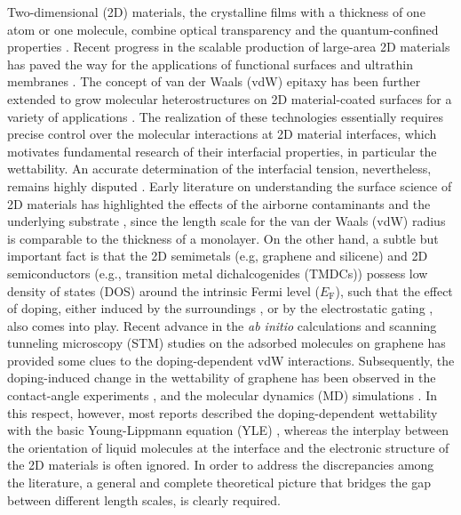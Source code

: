 \documentclass[journal=jacsat,manuscript=article,email=true,hyperref=true,keywords=true]{achemso}
\begin{document}
Two-dimensional (2D) materials, the crystalline films with a thickness
of one atom or one molecule, combine optical transparency and the
quantum-confined properties
\cite{Novoselov_2005,Mas_Ballest__2011,Novoselov_2016}.  Recent progress
in the scalable production of large-area 2D materials
\cite{Boott_2015,Li_2016} has paved the way for the applications of
functional surfaces and ultrathin membranes
\cite{Prasai_2012,Feng_2016,Rafiee_2010,Yin_2014,Surwade_2015,Hern_ndez_2013}.
The concept of van der Waals (vdW) epitaxy has been further extended
to grow molecular heterostructures on 2D material-coated surfaces for
a variety of applications
\cite{Shi_2012_epitaxy_graphene,Kim_2017_remote_epitaxy,Novoselov_2016}. The
realization of these technologies essentially requires precise control
over the molecular interactions at 2D material interfaces, which
motivates fundamental research of their interfacial properties, in
particular the wettability.  An accurate determination of the
interfacial tension, nevertheless, remains highly disputed
\cite{taherian2013what,Kozbial_2015,Parobek_2015,Govind_Rajan_2016}. Early
literature on understanding the surface science of 2D materials has
highlighted the effects of the airborne contaminants
\cite{li_effect_2013,Xu_2013_withwhat,kozbial_study_2014,Kozbial_2015,Chow_2015}
and the underlying substrate
\cite{raj_wettability_2013,rafiee_wetting_2012,shih_breakdown_2012,shih_wetting_2013},
since the length scale for the van der Waals (vdW) radius is
comparable to the thickness of a monolayer. On the other hand, a
subtle but important fact is that the 2D semimetals (e.g, graphene and
silicene) and 2D semiconductors (e.g., transition metal
dichalcogenides (TMDCs)) possess low density of states (DOS) around
the intrinsic Fermi level (\(E_{\mathrm{F}}\)), such that the effect of
doping, either induced by the surroundings
\cite{Chen_2013,Varchon_2007,Giovannetti_2008}, or by the electrostatic
gating \cite{Das_2008,Perera_2013}, also comes into play. Recent advance
in the \textit{ab initio} calculations and scanning tunneling
microscopy (STM) studies on the adsorbed molecules on graphene
\cite{Muruganathan_2015,Huttmann_2015} has provided some clues to the
doping-dependent vdW interactions. Subsequently, the doping-induced
change in the wettability of graphene has been observed in the
contact-angle experiments
\cite{hong_mechanism_2016,goniszewski_correlation_2016,ashraf_doping-induced_2016},
and the molecular dynamics (MD) simulations
\cite{ostrowski_tunable_2014,ren_interfacial_2015,Taherian_2015,daub_electrowetting_2007}. In
this respect, however, most reports described the doping-dependent
wettability with the basic Young-Lippmann equation (YLE)
\cite{Lippmann_1875}, whereas the interplay between the orientation of
liquid molecules at the interface \cite{Shen_2006} and the electronic
structure of the 2D materials is often ignored. In order to address
the discrepancies among the literature, a general and complete
theoretical picture that bridges the gap between different length
scales, is clearly required.
\end{document}
